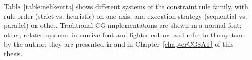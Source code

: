 

Table~\ref{table:nelikentta} shows different systems of the constraint rule family, 
with rule order (strict vs. heuristic) on one axis, 
and execution strategy (sequential vs. parallel) on other. 
Traditional CG implementations are shown in a normal font; other, related systems in cursive font and lighter colour.
\satcgMax and \satcgOrd refer to the systems by the author; they are presented in \cite{listenmaa_claessen2015} and in Chapter~\ref{chapterCGSAT} of this thesis.






% 
% 
% 
% 
% 

